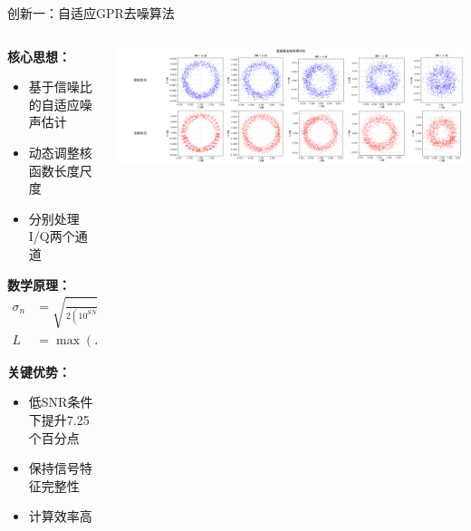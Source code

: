\documentclass[aspectratio=169]{beamer}
\begin{document}
\begin{frame}{创新一：自适应GPR去噪算法}
\begin{columns}
\begin{column}{0.6\textwidth}
\textbf{核心思想：}
\begin{itemize}
\item 基于信噪比的自适应噪声估计
\item 动态调整核函数长度尺度
\item 分别处理I/Q两个通道
\end{itemize}

\textbf{数学原理：}
\begin{align}
\sigma_n &= \sqrt{\frac{P_r}{2(10^{SNR_{dB}/10}+1)}} \\
L &= \max(L_{min}, L_0(1+SNR/20))
\end{align}

\textbf{关键优势：}
\begin{itemize}
\item 低SNR条件下提升7.25个百分点
\item 保持信号特征完整性
\item 计算效率高
\end{itemize}
\end{column}
\begin{column}{0.4\textwidth}
\includegraphics[width=\textwidth]{../paper/figure/constellation_denoising.png}
\end{column}
\end{columns}
\end{frame}
\end{document}
